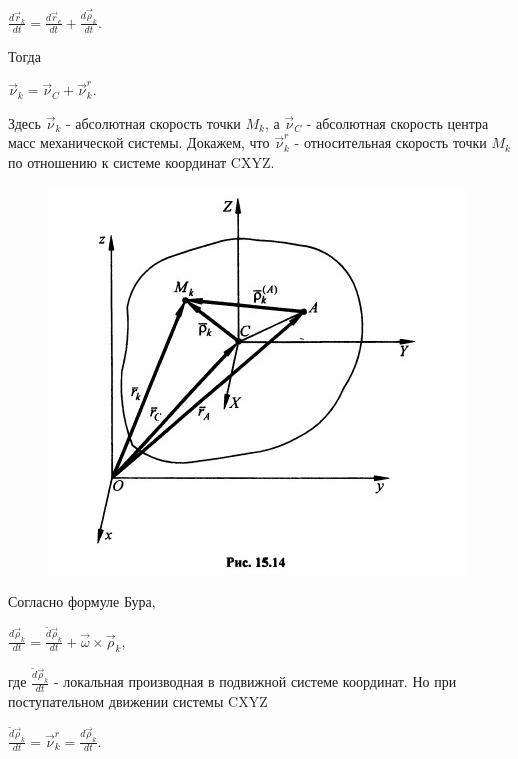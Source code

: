 {\begin{center}
	  \par $\frac{d \vec r_k}{dt} = \frac{d \vec r_c}{dt} + \frac{d \vec\rho_k}{dt}$.
     
	  \par Тогда

	  \par $\vec\nu_k = \vec\nu_C + \vec\nu_k^r$.

	  \par Здесь $\vec\nu_k$ - абсолютная скорость точки $M_k$, а $\vec\nu_C$ - абсолютная скорость центра масс механической системы. Докажем, что $\vec\nu_k^r$ - относительная скорость точки $M_k$ по отношению к системе координат CXYZ.

	  \par \begin{figure}[H]
     \centering\includegraphics[scale=0.7]{img/15.14.jpg} 
     \end{figure}

	  \par Согласно формуле Бура,

	  \par $\frac{d \vec\rho_k}{dt} = \frac{\widetilde{d} \vec\rho_k}{dt} + \vec\omega \times \vec\rho_k$,

	  \par где $\frac{\widetilde{d} \vec\rho_k}{dt}$ - локальная производная в подвижной системе координат. Но при поступательном движении системы CXYZ

	  \par $\frac{\widetilde{d} \vec\rho_k}{dt} = \vec\nu_k^r = \frac{d \vec\rho_k}{dt}$.


\end{center}}
